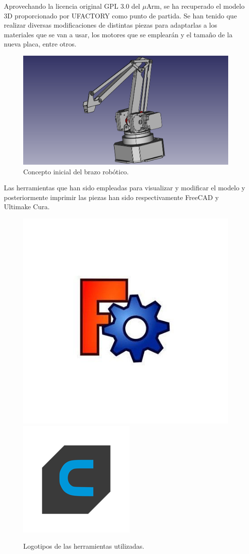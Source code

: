 Aprovechando la licencia original GPL 3.0 del $\mu$Arm, se ha recuperado el modelo 3D proporcionado por UFACTORY como punto de partida. 
Se han tenido que realizar diversas
modificaciones de distintas piezas para adaptarlas a los materiales que se van a usar,
los motores que se emplearán y el tamaño de la nueva placa, entre otros.

\begin{figure}[H]
    \centering
    \includegraphics[width=.8\linewidth]{pictures/brazo_vista_3d_inicial.png}
    \caption{Concepto inicial del brazo robótico.}
    \label{fig:manipulador_inicial}
\end{figure}

Las herramientas que han sido empleadas para visualizar y modificar el modelo y posteriormente imprimir las piezas han sido respectivamente FreeCAD y Ultimake Cura.

\begin{figure}[H]
    \centering
    \includegraphics[width=.45\linewidth]{pictures/freeCAD.jpg}
    \hspace{1cm}
    \includegraphics[width=.40\linewidth]{pictures/Ultimaker_cura_logo.png}
    \caption{Logotipos de las herramientas utilizadas.}
    \label{fig:herramientas_3d}
\end{figure}

